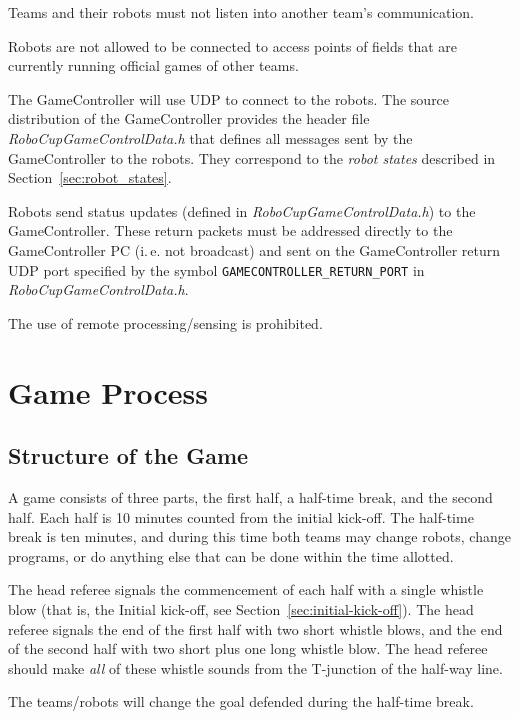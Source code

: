 \documentclass[12pt]{article}
\newcommand{\ie}{\mbox{i.\,e.}\xspace}
\newcommand{\cf}{see\xspace}
\begin{document}
Teams and their robots must not listen into another team's communication.

Robots are not allowed to be connected to access points of fields that are currently running official games of other teams.

The GameController will use UDP to connect to the robots. The source distribution of the GameController provides the header file \emph{RoboCupGameControlData.h} that defines all messages sent by the GameController to the robots. They correspond to the \emph{robot states} described in Section~\ref{sec:robot_states}.

Robots send status updates (defined in \emph{RoboCupGameControlData.h}) to the GameController. These return packets must be addressed directly to the GameController PC (\ie not broadcast) and sent on the GameController return UDP port specified by the symbol \verb!GAMECONTROLLER_RETURN_PORT! in \emph{RoboCupGameControlData.h}.

The use of remote processing/sensing is prohibited.


\newpage


\section{Game Process}
\label{sec:game_process}

\subsection{Structure of the Game}
\label{sec:game_struct}

A game consists of three parts, the first half, a half-time break, and the second half. Each half is 10 minutes counted from the initial kick-off.
The half-time break is ten minutes, and during this time both teams may change robots, change programs, or do anything else that can be done within the time allotted.

The head referee signals the commencement of each half with a single whistle blow (that is, the Initial kick-off, \cf Section~\ref{sec:initial-kick-off}).
The head referee signals the end of the first half with two short whistle blows, and the end of the second half with two short plus one long whistle blow.
The head referee should make \textit{all} of these whistle sounds from the T-junction of the half-way line.

The teams/robots will change the goal defended during the half-time break.
\end{document}
